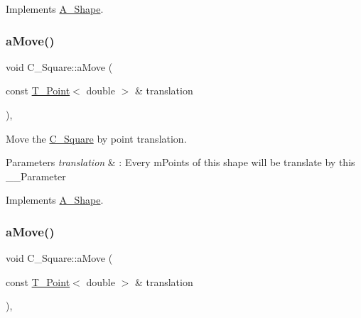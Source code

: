 Implements \hyperlink{classA__Shape_abe947e7003cb63be2b4f6c439533427d}{A\+\_\+\+Shape}.

\mbox{\label{classC__Square_a6727523558c58dcd240ec080f254e7c9}} 
\subsubsection{\texorpdfstring{a\+Move()}{aMove()}\hspace{0.1cm}{\footnotesize\ttfamily [1/2]}}
{\footnotesize\ttfamily void C\+\_\+\+Square\+::a\+Move (\begin{DoxyParamCaption}\item[{const \hyperlink{classT__Point}{T\+\_\+\+Point}$<$ double $>$ \&}]{translation }\end{DoxyParamCaption})\hspace{0.3cm}{\ttfamily [override]}, {\ttfamily [virtual]}}



Move the \hyperlink{classC__Square}{C\+\_\+\+Square} by point translation. 


\begin{DoxyParams}{Parameters}
{\em translation} & \+: Every m\+Points of this shape will be translate by this \+\_\+\+\_\+\+Parameter \\
\hline
\end{DoxyParams}


Implements \hyperlink{classA__Shape_ab284298db1b557ccfa7ba6de7a5fee2c}{A\+\_\+\+Shape}.

\mbox{\label{classC__Square_a6727523558c58dcd240ec080f254e7c9}} 
\subsubsection{\texorpdfstring{a\+Move()}{aMove()}\hspace{0.1cm}{\footnotesize\ttfamily [2/2]}}
{\footnotesize\ttfamily void C\+\_\+\+Square\+::a\+Move (\begin{DoxyParamCaption}\item[{const \hyperlink{classT__Point}{T\+\_\+\+Point}$<$ double $>$ \&}]{translation }\end{DoxyParamCaption})\hspace{0.3cm}{\ttfamily [override]}, {\ttfamily [virtual]}}



